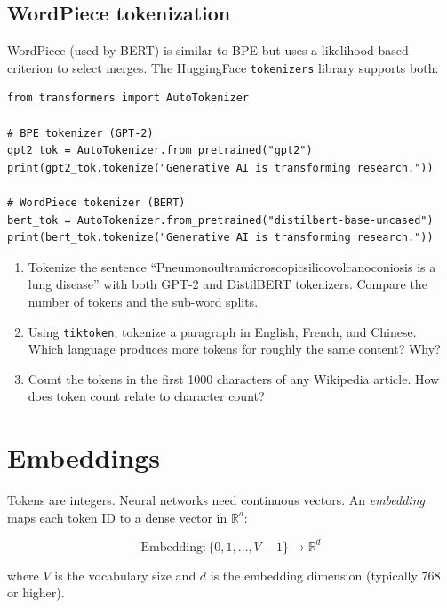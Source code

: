 \subsection{WordPiece tokenization}

WordPiece (used by BERT) is similar to BPE but uses a likelihood-based criterion to select merges. The HuggingFace \texttt{tokenizers} library supports both:

\begin{verbatim}
from transformers import AutoTokenizer

# BPE tokenizer (GPT-2)
gpt2_tok = AutoTokenizer.from_pretrained("gpt2")
print(gpt2_tok.tokenize("Generative AI is transforming research."))

# WordPiece tokenizer (BERT)
bert_tok = AutoTokenizer.from_pretrained("distilbert-base-uncased")
print(bert_tok.tokenize("Generative AI is transforming research."))
\end{verbatim}

\begin{exercise}
\begin{enumerate}
  \item Tokenize the sentence ``Pneumonoultramicroscopicsilicovolcanoconiosis is a lung disease'' with both GPT-2 and DistilBERT tokenizers. Compare the number of tokens and the sub-word splits.
  \item Using \texttt{tiktoken}, tokenize a paragraph in English, French, and Chinese. Which language produces more tokens for roughly the same content? Why?
  \item Count the tokens in the first 1000 characters of any Wikipedia article. How does token count relate to character count?
\end{enumerate}
\end{exercise}

\section{Embeddings}

Tokens are integers. Neural networks need continuous vectors. An \emph{embedding} maps each token ID to a dense vector in $\mathbb{R}^d$:

\[
\text{Embedding}: \{0, 1, \ldots, V-1\} \rightarrow \mathbb{R}^d
\]

where $V$ is the vocabulary size and $d$ is the embedding dimension (typically 768 or higher).

